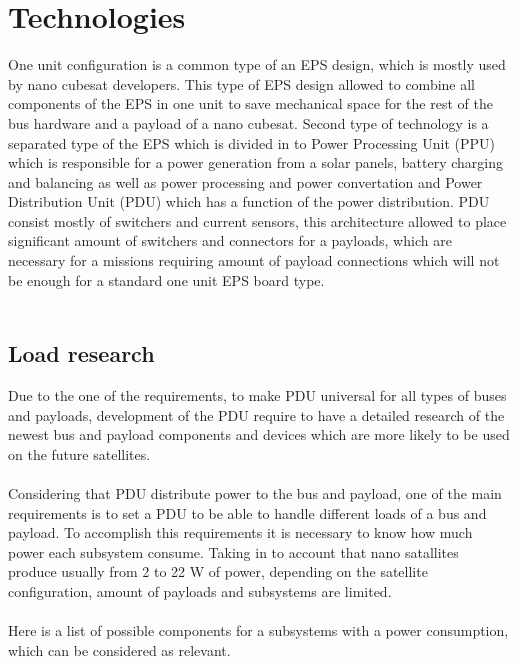 \section{Technologies \label{sec:tech}}

One unit configuration is a common type of an EPS design, which is mostly used by nano cubesat developers. This type of EPS design allowed to combine all components of the EPS in one unit to save mechanical space for the rest of the bus hardware and a payload of a nano cubesat. Second type of technology is a separated type of the EPS which is divided in to Power Processing Unit (PPU) which is responsible for a power generation from a solar panels, battery charging and balancing as well as power processing and power convertation and Power Distribution Unit (PDU) which has a function of the power distribution. PDU consist mostly of switchers and current sensors, this architecture allowed to place significant amount of switchers and connectors for a payloads, which are necessary for a missions requiring amount of payload connections which will not be enough for a standard one unit EPS board type. \\
\\


\subsection{Load research\label{sec:aaa}}

Due to the one of the requirements, to make PDU universal for all types of buses and payloads, development of the PDU require to have a detailed research of the newest bus and payload components and devices which are more likely to be used on the future satellites.\\
\\
 Considering that PDU distribute power to the bus and payload, one of the main requirements is to set a PDU to be able to handle different loads of a bus and payload. To accomplish this requirements it is necessary to know how much power each subsystem consume. Taking in to account that nano satallites produce usually from 2 to 22 W of power, depending on the satellite configuration, amount of payloads and subsystems are limited. \\
 \\
 Here is a list of possible components for a subsystems with a power consumption, which can be considered as relevant. \\ \\ \\ \\
 
